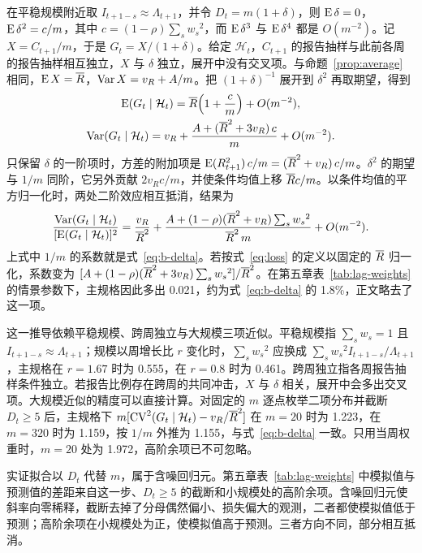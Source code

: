 在平稳规模附近取 $I_{t+1-s}\approx\Lambda_{t+1}$，并令 $D_t=m(1+\delta)$，则 $\operatorname{E}\delta=0$，$\operatorname{E}\delta^2=c/m$，其中 $c=(1-\rho)\sum_s {w_s}^2$，而 $\operatorname{E}\delta^3$ 与 $\operatorname{E}\delta^4$ 都是 $O(m^{-2})$。记 $X=C_{t+1}/m$，于是 $G_t=X/(1+\delta)$。给定 $\mathcal H_t$，$C_{t+1}$ 的报告抽样与此前各周的报告抽样相互独立，$X$ 与 $\delta$ 独立，展开中没有交叉项。与命题~\ref{prop:average} 相同，$\operatorname{E} X=\overline{R}$，$\operatorname{Var} X=v_R+A/m$。把 $(1+\delta)^{-1}$ 展开到 $\delta^2$ 再取期望，得到
\begin{gather*}
  \operatorname{E}(G_t\mid\mathcal H_t)=\overline{R}\Bigl(1+\frac cm\Bigr)+O(m^{-2}),\\
  \operatorname{Var}(G_t\mid\mathcal H_t)=v_R+\frac{A+(\overline{R}^2+3v_R)\,c}{m}+O(m^{-2}).
\end{gather*}
只保留 $\delta$ 的一阶项时，方差的附加项是 $\operatorname{E}(R_{t+1}^2)\,c/m=(\overline{R}^2+v_R)\,c/m$。$\delta^2$ 的期望与 $1/m$ 同阶，它另外贡献 $2v_Rc/m$，并使条件均值上移 $\overline{R} c/m$。以条件均值的平方归一化时，两处二阶效应相互抵消，结果为
\begin{equation*}
  \frac{\operatorname{Var}(G_t\mid\mathcal H_t)}{[\operatorname{E}(G_t\mid\mathcal H_t)]^2}
  =\frac{v_R}{\overline{R}^2}+\frac{A+(1-\rho)(\overline{R}^2+v_R)\sum_s {w_s}^2}{\overline{R}^2\,m}+O(m^{-2}).
\end{equation*}
上式中 $1/m$ 的系数就是式~\eqref{eq:b-delta}。若按式~\eqref{eq:loss} 的定义以固定的 $\overline{R}$ 归一化，系数变为 $[A+(1-\rho)(\overline{R}^2+3v_R)\sum_s {w_s}^2]/\overline{R}^2$。在第五章表~\ref{tab:lag-weights} 的情景参数下，主规格因此多出 0.021，约为式~\eqref{eq:b-delta} 的 1.8\%，正文略去了这一项。

这一推导依赖平稳规模、跨周独立与大规模三项近似。平稳规模指 $\sum_s w_s=1$ 且 $I_{t+1-s}\approx\Lambda_{t+1}$；规模以周增长比 $r$ 变化时，$\sum_s {w_s}^2$ 应换成 $\sum_s {w_s}^2I_{t+1-s}/\Lambda_{t+1}$，主规格在 $r=1.67$ 时为 0.555，在 $r=0.8$ 时为 0.461。跨周独立指各周报告抽样条件独立。若报告比例存在跨周的共同冲击，$X$ 与 $\delta$ 相关，展开中会多出交叉项。大规模近似的精度可以直接计算。对固定的 $m$ 逐点枚举二项分布并截断 $D_t\geq5$ 后，主规格下 $m[\operatorname{CV}^2(G_t\mid\mathcal H_t)-v_R/\overline{R}^2]$ 在 $m=20$ 时为 1.223，在 $m=320$ 时为 1.159，按 $1/m$ 外推为 1.155，与式~\eqref{eq:b-delta} 一致。只用当周权重时，$m=20$ 处为 1.972，高阶余项已不可忽略。

实证拟合以 $D_t$ 代替 $m$，属于含噪回归元。第五章表~\ref{tab:lag-weights} 中模拟值与预测值的差距来自这一步、$D_t\geq5$ 的截断和小规模处的高阶余项。含噪回归元使斜率向零稀释，截断去掉了分母偶然偏小、损失偏大的观测，二者都使模拟值低于预测；高阶余项在小规模处为正，使模拟值高于预测。三者方向不同，部分相互抵消。
